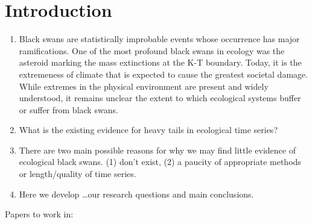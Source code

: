 \documentclass[12pt]{article}
\begin{document}


\section{Introduction}

\begin{enumerate}
\item Black swans are statistically improbable events whose occurrence has major ramifications. One of the most profound black swans in ecology was the asteroid marking the mass extinctions at the K-T boundary. Today, it is the extremeness of climate that is expected to cause the greatest societal damage. While extremes in the physical environment are present and widely understood, it remains unclear the extent to which ecological systems buffer or suffer from black swans.

\item What is the existing evidence for heavy tails in ecological time series?

\item There are two main possible reasons for why we may find little evidence of ecological black swans. (1) don't exist, (2) a paucity of appropriate methods or length/quality of time series.

\item Here we develop \ldots our research questions and main conclusions.

\end{enumerate}


\bigskip
Papers to work in:

\citep{inchausti2002,halley2002,inchausti2001}

\citep{jentsch2007}

\citep{ward2007}

\citep{garcia-carreras2011}
\citep{sornette2009}

\citep{nunez2012}

\citep{thompson2013}
\citep{beaugrand2012}
\citep{pine-iii2009}
\end{document}
